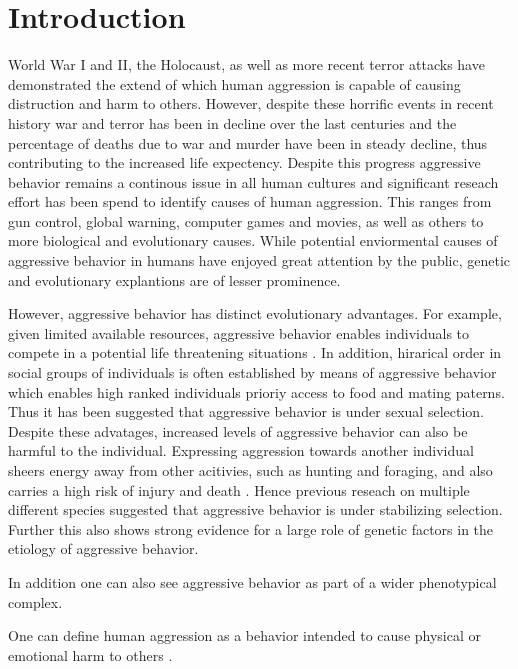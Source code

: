 \chapter{Introduction}
\label{cha:introduction}
World War I and II, the Holocaust, as well as more recent terror attacks have demonstrated the extend of which human aggression is capable of causing distruction and harm to others. 
However, despite these horrific events in recent history war and terror has been in decline over the last centuries %
and the percentage of deaths due to war and murder have been in steady decline, thus contributing to the increased life expectency.
Despite this progress aggressive behavior remains a continous issue in all human cultures and significant reseach effort has been spend to identify causes of human aggression.  
This ranges from gun control, global warning, computer games and movies, as well as others to more biological and evolutionary causes. %
While potential enviormental causes of aggressive behavior in humans have enjoyed great attention by the public, genetic and evolutionary explantions are of lesser prominence.

However, aggressive behavior has distinct evolutionary advantages.
For example, given limited available resources, aggressive behavior enables individuals to compete in a potential life threatening situations \cite[]{Anholt2012}.
In addition, hirarical order in social groups of individuals is often established by means of aggressive behavior which enables high ranked individuals prioriy access to food and mating paterns. 
Thus it has been suggested that aggressive behavior is under sexual selection\cite{Lindenfors2011}.
Despite these advatages, increased levels of aggressive behavior can also be harmful to the individual.
Expressing aggression towards another individual sheers energy away from other acitivies, such as hunting and foraging, and also carries a high risk of injury and death \cite{Packer1995}.  
Hence previous reseach on multiple different species suggested that aggressive behavior is under stabilizing selection.
Further this also shows strong evidence for a large role of genetic factors in the etiology of aggressive behavior. 


In addition one can also see aggressive behavior as part of a wider phenotypical complex. 

One can define human aggression as a behavior intended to cause physical or emotional harm to others \cite{Anderson2002}.

